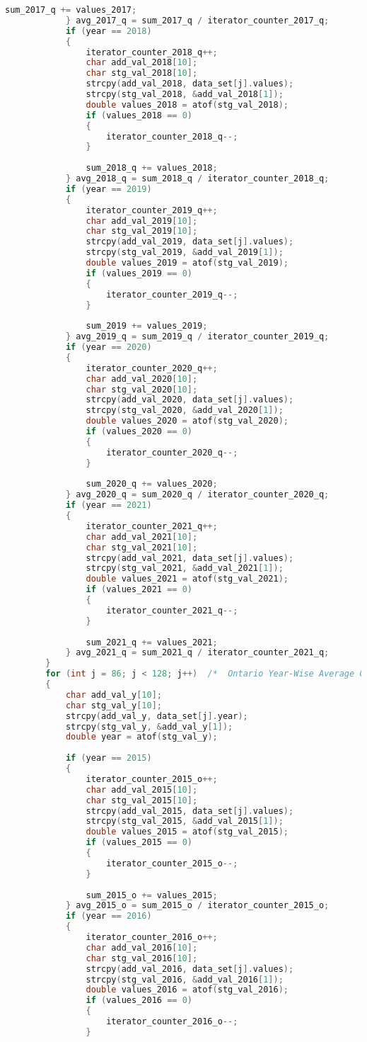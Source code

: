 \begin{lstlisting}[language=C, caption=\textit{CPS 188 Term Project Source Code}]
				sum_2017_q += values_2017;
			} avg_2017_q = sum_2017_q / iterator_counter_2017_q;
			if (year == 2018)
			{
				iterator_counter_2018_q++;
				char add_val_2018[10];
				char stg_val_2018[10];
				strcpy(add_val_2018, data_set[j].values);
				strcpy(stg_val_2018, &add_val_2018[1]);
				double values_2018 = atof(stg_val_2018);
				if (values_2018 == 0)
				{
					iterator_counter_2018_q--;
				}
				
				sum_2018_q += values_2018;
			} avg_2018_q = sum_2018_q / iterator_counter_2018_q;
			if (year == 2019)
			{
				iterator_counter_2019_q++;
				char add_val_2019[10];
				char stg_val_2019[10];
				strcpy(add_val_2019, data_set[j].values);
				strcpy(stg_val_2019, &add_val_2019[1]);
				double values_2019 = atof(stg_val_2019);
				if (values_2019 == 0)
				{
					iterator_counter_2019_q--;
				}
				
				sum_2019 += values_2019;
			} avg_2019_q = sum_2019_q / iterator_counter_2019_q;
			if (year == 2020)
			{
				iterator_counter_2020_q++;
				char add_val_2020[10];
				char stg_val_2020[10];
				strcpy(add_val_2020, data_set[j].values);
				strcpy(stg_val_2020, &add_val_2020[1]);
				double values_2020 = atof(stg_val_2020);
				if (values_2020 == 0)
				{
					iterator_counter_2020_q--;
				}
				
				sum_2020_q += values_2020;
			} avg_2020_q = sum_2020_q / iterator_counter_2020_q;
			if (year == 2021)
			{
				iterator_counter_2021_q++;
				char add_val_2021[10];
				char stg_val_2021[10];
				strcpy(add_val_2021, data_set[j].values);
				strcpy(stg_val_2021, &add_val_2021[1]);
				double values_2021 = atof(stg_val_2021);
				if (values_2021 == 0)
				{
					iterator_counter_2021_q--;
				}
				
				sum_2021_q += values_2021;
			} avg_2021_q = sum_2021_q / iterator_counter_2021_q;
		}
		for (int j = 86; j < 128; j++)	/*	Ontario Year-Wise Average Calculator	*/
		{
			char add_val_y[10];
			char stg_val_y[10];
			strcpy(add_val_y, data_set[j].year);
			strcpy(stg_val_y, &add_val_y[1]);
			double year = atof(stg_val_y);
			
			if (year == 2015)
			{
				iterator_counter_2015_o++;
				char add_val_2015[10];
				char stg_val_2015[10];
				strcpy(add_val_2015, data_set[j].values);
				strcpy(stg_val_2015, &add_val_2015[1]);
				double values_2015 = atof(stg_val_2015);
				if (values_2015 == 0)
				{
					iterator_counter_2015_o--;
				}
				
				sum_2015_o += values_2015;
			} avg_2015_o = sum_2015_o / iterator_counter_2015_o;
			if (year == 2016)
			{
				iterator_counter_2016_o++;
				char add_val_2016[10];
				char stg_val_2016[10];
				strcpy(add_val_2016, data_set[j].values);
				strcpy(stg_val_2016, &add_val_2016[1]);
				double values_2016 = atof(stg_val_2016);
				if (values_2016 == 0)
				{
					iterator_counter_2016_o--;
				}
				

\end{lstlisting}
